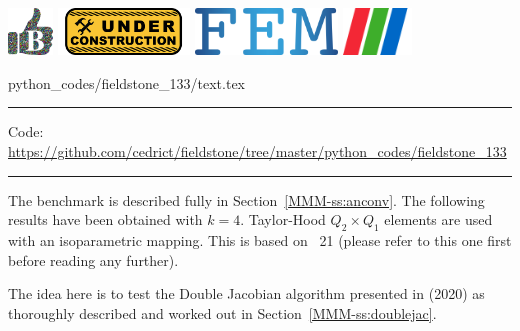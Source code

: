 \noindent
\includegraphics[height=1.25cm]{images/pictograms/benchmark}
\includegraphics[height=1.25cm]{images/pictograms/under_construction}
\includegraphics[height=1.25cm]{images/pictograms/FEM}
\includegraphics[height=1.25cm]{images/pictograms/paraview}


\begin{flushright} {\tiny {\color{gray} python\_codes/fieldstone\_133/text.tex}} \end{flushright}

%

\par\noindent\rule{\textwidth}{0.4pt}

\begin{center}
\inpython
{\small Code: \url{https://github.com/cedrict/fieldstone/tree/master/python_codes/fieldstone_133}}
\end{center}

\par\noindent\rule{\textwidth}{0.4pt}

The benchmark is described fully in Section~\ref{MMM-ss:anconv}. 
The following results have been obtained with $k=4$.
Taylor-Hood $Q_2\times Q_1$ elements are used with an isoparametric mapping. 
This \stone is based on \stone~21 (please refer to this one first 
before reading any further).

The idea here is to test the Double Jacobian algorithm presented in \textcite{moth20} (2020)
as thoroughly described and worked out in Section~\ref{MMM-ss:doublejac}.

